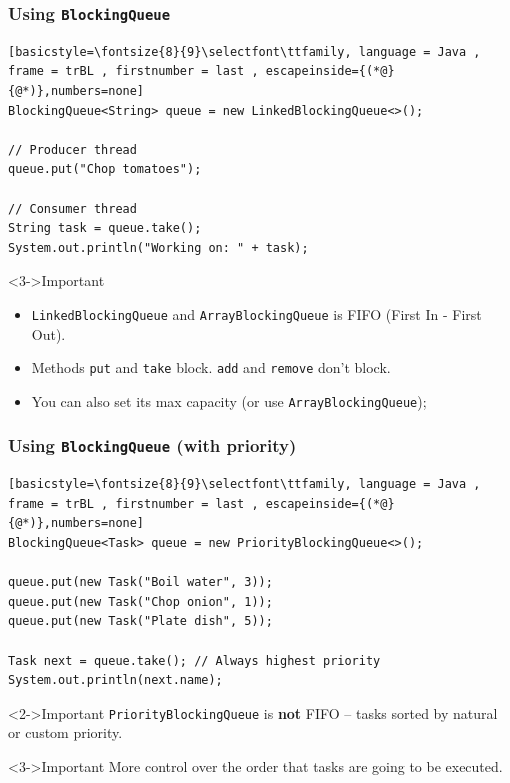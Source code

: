 \documentclass[xcolor={dvipsnames,svgnames},aspectratio=169]{beamer}
\begin{document}
\begin{frame}[fragile]
  \frametitle{Using \texttt{BlockingQueue}}
\begin{lstlisting}[basicstyle=\fontsize{8}{9}\selectfont\ttfamily, language = Java ,
frame = trBL , firstnumber = last , escapeinside={(*@}{@*)},numbers=none]
BlockingQueue<String> queue = new LinkedBlockingQueue<>();

// Producer thread
queue.put("Chop tomatoes");

// Consumer thread
String task = queue.take();
System.out.println("Working on: " + task);
\end{lstlisting}
  \begin{block}<3->{\faLightbulb \quad Important}
    \begin{itemize}
    \item[\faBook] \texttt{LinkedBlockingQueue} and \texttt{ArrayBlockingQueue}
      is FIFO (First In - First Out).
    \item[\faBook] Methods \texttt{put} and \texttt{take} block. \texttt{add}
      and \texttt{remove} don't block.
    \item[\faBook] You can also set its max capacity (or use \texttt{ArrayBlockingQueue});
    \end{itemize}
  \end{block}
\end{frame}

\begin{frame}[fragile]
  \frametitle{Using \texttt{BlockingQueue} (with priority)}
\begin{lstlisting}[basicstyle=\fontsize{8}{9}\selectfont\ttfamily, language = Java ,
frame = trBL , firstnumber = last , escapeinside={(*@}{@*)},numbers=none]
BlockingQueue<Task> queue = new PriorityBlockingQueue<>();

queue.put(new Task("Boil water", 3));
queue.put(new Task("Chop onion", 1));
queue.put(new Task("Plate dish", 5));

Task next = queue.take(); // Always highest priority
System.out.println(next.name);
\end{lstlisting}
  \begin{block}<2->{\faLightbulb \quad Important}
    \texttt{PriorityBlockingQueue} is \textbf{not} FIFO -- tasks sorted by
    natural or custom priority.
  \end{block}
  \vspace{0.2cm}
  \begin{block}<3->{\faLightbulb \quad Important}
    More control over the order that tasks are going to be executed.
  \end{block}
\end{frame}
\end{document}
